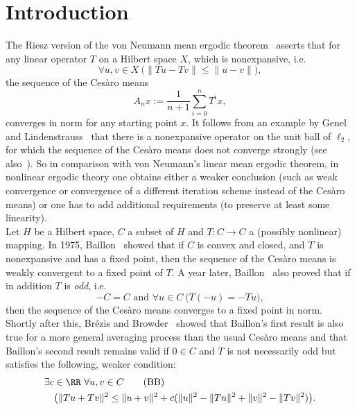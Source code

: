 \section{Introduction}


The Riesz version of the von Neumann mean ergodic theorem~\cite{Neumann1932} asserts that for any linear operator $T$ on a Hilbert space $X$, which is nonexpansive, i.e. 
\[
\forall u,v\in X\ \big(\|Tu-Tv\|\leq\|u-v\|\big),
\]
the sequence of the  Ces{\`a}ro means
\[
A_nx:=\frac{1}{n+1}\sum^{n}_{i=0} T^i x,
\]
converges in norm for any starting point $x$. 
It follows from an example 
by Genel and Lindenstrauss~\cite{Genel1975} that there is a nonexpansive operator on
the unit ball of $\ell_2$, for which the sequence of the  Ces{\`a}ro means does not converge strongly (see also~\cite{Krengel1985}).
So in comparison with von Neumann's linear mean ergodic theorem, in nonlinear ergodic theory 
one obtains either a weaker conclusion (such as weak convergence or convergence of a different
iteration scheme instead of the Ces{\`a}ro means) or one has to add additional requirements 
(to preserve at least some linearity).\\ 
Let $H$ be a Hilbert space, $C$ a subset of $H$ and
$T:C\to C$ a (possibly nonlinear) mapping. In 1975, Baillon~\cite{Baillon1975} showed  that if $C$ is convex and closed,
and $T$ is nonexpansive and has a fixed point, then the sequence of the Ces{\`a}ro means is weakly convergent to a fixed point of $T$.
A year later, Baillon~\cite{Baillon1976} also proved that if in addition $T$ is {\em odd}, i.e.
\[
-C = C\text{ and } \forall u\in C\ \big( T(-u)=-Tu\big),
\]
then the sequence of the Ces{\`a}ro means converges to a fixed point in norm. Shortly after this,
Br\'ezis and Browder~\cite{Brezis1976} showed that 
Baillon's first result is also true for a more general averaging process than the usual Ces{\`a}ro means
and that
Baillon's second
result remains valid if $0\in C$ and $T$ is not necessarily odd but satisfies the following, weaker condition:
\begin{align*}
\exists c&\in\RR\ \forall u,v \in C \tag{BB}\label{e:BB}\\
 &\big(\|Tu+Tv\|^2\leq\|u+v\|^2+c(\|u\|^2-\|Tu\|^2+\|v\|^2-\|Tv\|^2)\big).
\end{align*}
